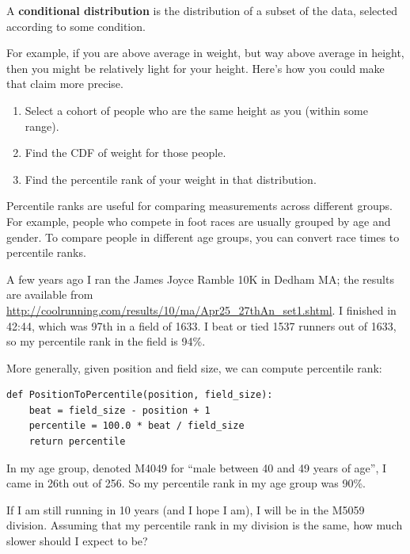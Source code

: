 \documentclass[12pt]{book}
\begin{document}
A {\bf conditional distribution} is the distribution of a subset of
the data, selected according to some condition.

For example, if you are above average in weight, but way above average
in height, then you might be relatively light for your height.  Here's
how you could make that claim more precise.

\begin{enumerate}

\item Select a cohort of people who are the same height as you (within
some range).

\item Find the CDF of weight for those people.

\item Find the percentile rank of your weight in that distribution.

\end{enumerate}

Percentile ranks are useful for comparing measurements across
different groups.  For example, people who compete in foot races are
usually grouped by age and gender.  To compare people in different
age groups, you can convert race times to percentile ranks.
 

A few years ago I ran the James Joyce Ramble 10K in
Dedham MA; the results are available from
\url{http://coolrunning.com/results/10/ma/Apr25_27thAn_set1.shtml}.
I finished in 42:44, which was 97th in a field of 1633.  I beat or
tied 1537 runners out of 1633, so my percentile rank in the field is
94\%.   

More generally, given position and field size, we can compute
percentile rank:

\begin{verbatim}
def PositionToPercentile(position, field_size):
    beat = field_size - position + 1
    percentile = 100.0 * beat / field_size
    return percentile
\end{verbatim}

In my age group, denoted M4049 for ``male between 40 and 49 years of
age'', I came in 26th out of 256.  So my percentile rank in my age
group was 90\%.

If I am still running in 10 years (and I hope I am), I will be in
the M5059 division.  Assuming that my percentile rank in my division
is the same, how much slower should I expect to be?
\end{document}
